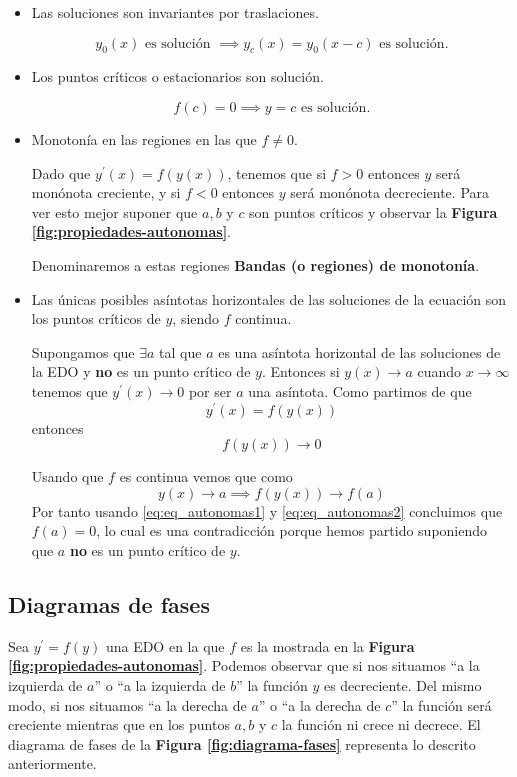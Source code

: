 \documentclass{mathnotes}
\begin{document}

\begin{itemize}
\item Las soluciones son invariantes por traslaciones.

$$y_0(x) \text{ es solución } \implies y_c(x) = y_0(x-c) \text{ es solución.}$$

\item Los puntos críticos o estacionarios son solución.

$$f(c) = 0 \implies y=c \text{ es solución.}$$

\item Monotonía en las regiones en las que $f\neq 0$.

Dado que $y^\prime(x) = f(y(x))$, tenemos que si $f\gt0$ entonces $y$ será monónota creciente, y si $f\lt0$ entonces $y$ será monónota decreciente. Para ver esto mejor suponer que $a,b$ y $c$ son puntos críticos y observar la \textbf{Figura \ref{fig:propiedades-autonomas}}.

Denominaremos a estas regiones \textbf{Bandas (o regiones) de monotonía}.

\item Las únicas posibles asíntotas horizontales de las soluciones de la ecuación son los puntos críticos de $y$, siendo $f$ continua.

Supongamos que $\exists a $ tal que $a$ es una asíntota horizontal de las soluciones de la EDO y \textbf{no} es un punto crítico de $y$. Entonces si $y(x)\to a$ cuando $x\to \infty$ tenemos que $y^\prime(x)\to 0$ por ser $a$ una asíntota. Como partimos de que $$y^\prime(x) = f(y(x))$$ entonces
\begin{equation}
f(y(x))\to 0
\label{eq:eq_autonomas1}
\end{equation}

Usando que $f$ es continua vemos que como 
\begin{equation}
y(x)\to a \implies f(y(x))\to f(a)
\label{eq:eq_autonomas2}
\end{equation}
Por tanto usando \ref{eq:eq_autonomas1} y \ref{eq:eq_autonomas2} concluimos que $f(a) = 0$, lo cual es una contradicción porque hemos partido suponiendo que $a$ \textbf{no} es un punto crítico de $y$.
\end{itemize}

\subsection{Diagramas de fases}
Sea $y^\prime = f(y)$ una EDO en la que $f$ es la mostrada en la \textbf{Figura \ref{fig:propiedades-autonomas}}. Podemos observar que si nos situamos ``a la izquierda de $a$'' o ``a la izquierda de $b$'' la función $y$ es decreciente. Del mismo modo, si nos situamos ``a la derecha de $a$'' o ``a la derecha de $c$'' la función será creciente mientras que en los puntos $a, b$ y $c$ la función ni crece ni decrece. El diagrama de fases de la \textbf{Figura \ref{fig:diagrama-fases}} representa lo descrito anteriormente. 
\end{document}
